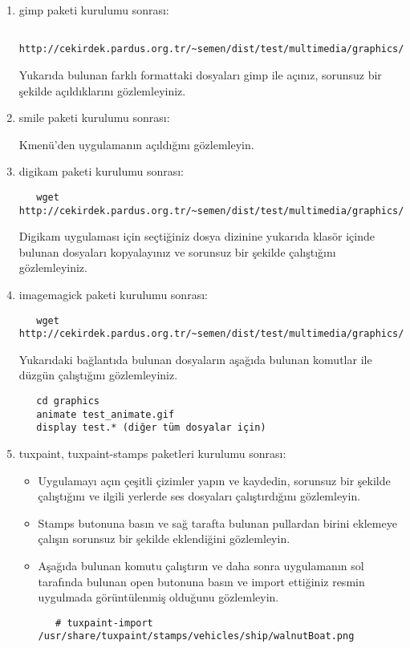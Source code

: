 \documentclass[a4paper,10pt]{article}
\begin{document}
\begin{enumerate}
 \item gimp paketi kurulumu sonrası:
  \begin{verbatim}
   http://cekirdek.pardus.org.tr/~semen/dist/test/multimedia/graphics/graphics.tar
  \end{verbatim}

 Yukarıda bulunan farklı formattaki dosyaları gimp ile açınız, sorunsuz bir şekilde açıldıklarını gözlemleyiniz.

\item smile paketi kurulumu sonrası:

Kmenü'den uygulamanın açıldığını gözlemleyin.

\item digikam paketi kurulumu sonrası:

  \begin{verbatim}
   wget http://cekirdek.pardus.org.tr/~semen/dist/test/multimedia/graphics/graphics.tar
  \end{verbatim}

 Digikam uygulaması için seçtiğiniz dosya dizinine yukarıda klasör içinde bulunan dosyaları kopyalayınız ve sorunsuz bir şekilde çalıştığını gözlemleyiniz.
\item imagemagick  paketi kurulumu sonrası:
  \begin{verbatim}
   wget http://cekirdek.pardus.org.tr/~semen/dist/test/multimedia/graphics/graphics.tar
  \end{verbatim}

Yukarıdaki bağlantıda bulunan dosyaların aşağıda bulunan komutlar ile düzgün çalıştığını gözlemleyiniz.
  \begin{verbatim}
   cd graphics
   animate test_animate.gif
   display test.* (diğer tüm dosyalar için)
  \end{verbatim}
\item tuxpaint, tuxpaint-stamps paketleri kurulumu sonrası:
  \begin{itemize}
   \item Uygulamayı açın çeşitli çizimler yapın ve kaydedin, sorunsuz bir şekilde çalıştığını ve ilgili yerlerde ses dosyaları çalıştırdığını gözlemleyin.
   \item Stamps butonuna basın ve sağ tarafta bulunan pullardan birini eklemeye çalışın sorunsuz bir şekilde eklendiğini gözlemleyin.
   \item Aşağıda bulunan komutu çalıştırın ve daha sonra uygulamanın sol tarafında bulunan open butonuna basın ve import ettiğiniz resmin uygulmada görüntülenmiş olduğunu gözlemleyin.
\begin{verbatim}
   # tuxpaint-import /usr/share/tuxpaint/stamps/vehicles/ship/walnutBoat.png
\end{verbatim} 
\end{itemize}


\end{enumerate}
\end{document}
